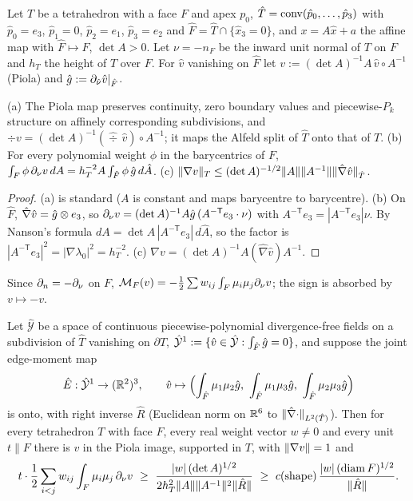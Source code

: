 Let $T$ be a tetrahedron with a face $F$ and apex $p_0$, $\hat T=\operatorname{conv}(\hat p_0,\dots,\hat p_3)$ with $\hat p_0=e_3$, $\hat p_1=0$, $\hat p_2=e_1$, $\hat p_3=e_2$ and $\hat F=\hat T\cap\{\hat x_3=0\}$, and $x=A\hat x+a$ the affine map with $\hat F\mapsto F$, $\det A>0$. Let $\nu=-n_F$ be the inward unit normal of $T$ on $F$ and $h_T$ the height of $T$ over $F$. For $\hat v$ vanishing on $\hat F$ let $v:=(\det A)^{-1}A\,\hat v\circ A^{-1}$ (Piola) and $\hat g:=\partial_{\hat\nu}\hat v|_{\hat F}$.

\begin{lemma}\label{sh:piola}
(a) The Piola map preserves continuity, zero boundary values and piecewise-$P_k$ structure on affinely corresponding subdivisions, and $\div v=(\det A)^{-1}(\widehat\div\,\hat v)\circ A^{-1}$; it maps the Alfeld split of $\hat T$ onto that of $T$.
(b) For every polynomial weight $\phi$ in the barycentrics of $F$, $\int_F\phi\,\partial_\nu v\,dA=h_T^{-2}A\int_{\hat F}\phi\,\hat g\,d\hat A$.
(c) $\lVert \nabla v\rVert_T\le(\det A)^{-1/2}\lVert A\rVert\lVert A^{-1}\rVert\lVert \hat\nabla\hat v\rVert_{\hat T}$.
\end{lemma}

\begin{proof}
(a) is standard ($A$ is constant and maps barycentre to barycentre). (b) On $\hat F$, $\hat\nabla\hat v=\hat g\otimes e_3$, so $\partial_\nu v=(\det A)^{-1}A\hat g\,(A^{-\mathsf T}e_3\cdot\nu)$ with $A^{-\mathsf T}e_3=|A^{-\mathsf T}e_3|\nu$. By Nanson's formula $dA=\det A\,|A^{-\mathsf T}e_3|\,d\hat A$, so the factor is $|A^{-\mathsf T}e_3|^2=|\nabla\lambda_0|^2=h_T^{-2}$. (c) $\nabla v=(\det A)^{-1}A(\hat\nabla\hat v)A^{-1}$.
\end{proof}
Since $\partial_n=-\partial_\nu$ on $F$, $\mathcal M_F(v)=-\frac12\sum w_{ij}\int_F\mu_i\mu_j\partial_\nu v$; the sign is absorbed by $v\mapsto-v$.

\begin{proposition}\label{sh:joint}
Let $\hat{\mathcal Y}$ be a space of continuous piecewise-polynomial divergence-free fields on a subdivision of $\hat T$ vanishing on $\partial\hat T$, $\hat{\mathcal Y}^1:=\{\hat v\in\hat{\mathcal Y}:\int_{\hat F}\hat g=0\}$, and suppose the joint edge-moment map
\[
\hat E:\hat{\mathcal Y}^1\to(\R^2)^3,\qquad\hat v\mapsto\Bigl(\int_{\hat F}\mu_1\mu_2\gh,\ \int_{\hat F}\mu_1\mu_3\gh,\ \int_{\hat F}\mu_2\mu_3\gh\Bigr)
\]
is onto, with right inverse $\hat R$ (Euclidean norm on $\mathbb R^6$ to $\lVert \hat\nabla\cdot\rVert_{L^2(\hat T)}$). Then for every tetrahedron $T$ with face $F$, every real weight vector $w\ne0$ and every unit $t\parallel F$ there is $v$ in the Piola image, supported in $T$, with $\lVert \nabla v\rVert=1$ and
\[
t\cdot\frac12\sum_{i<j}w_{ij}\int_F\mu_i\mu_j\,\partial_\nu v\ \ge\ \frac{|w|\,(\det A)^{1/2}}{2h_T^2\lVert A\rVert\lVert A^{-1}\rVert^2\lVert \hat R\rVert}\ \ge\ c(\text{shape})\,\frac{|w|\,(\operatorname{diam} F)^{1/2}}{\lVert \hat R\rVert} .
\]
\end{proposition}

